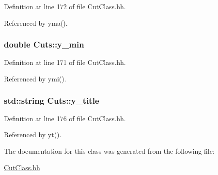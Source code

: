 Definition at line 172 of file Cut\-Class.\-hh.



Referenced by yma().

\subsubsection[{y\-\_\-min}]{\setlength{\rightskip}{0pt plus 5cm}double Cuts\-::y\-\_\-min\hspace{0.3cm}{\ttfamily [private]}}\label{classCuts_a63a13001d11785cfef2bb686216b4352}


Definition at line 171 of file Cut\-Class.\-hh.



Referenced by ymi().

\subsubsection[{y\-\_\-title}]{\setlength{\rightskip}{0pt plus 5cm}std\-::string Cuts\-::y\-\_\-title\hspace{0.3cm}{\ttfamily [private]}}\label{classCuts_a614ea94fe39f141a1ec195e99d01eecf}


Definition at line 176 of file Cut\-Class.\-hh.



Referenced by yt().



The documentation for this class was generated from the following file\-:\begin{DoxyCompactItemize}
\item 
\hyperlink{CutClass_8hh}{Cut\-Class.\-hh}\end{DoxyCompactItemize}
